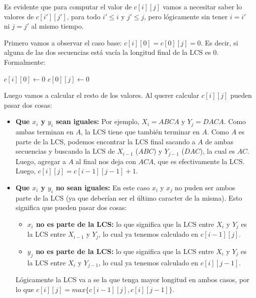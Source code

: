Es evidente que para computar el valor de $c[i][j]$ vamos a necesitar saber lo valores de $c[i'][j']$, para todo $i' \leq i$ y $j' \leq j$, pero l\'ogicamente sin tener $i = i'$ ni $j = j'$ al mismo tiempo.

Primero vamos a observar el caso base: $c[i][0] = c[0][j] = 0$. Es decir, si alguna de las dos secuencias est\'a vac\'ia la longitud final de la LCS es $0$. Formalmente:

\begin{algorithm}
\begin{algorithmic}[1]
  \State $c[i][0] \gets 0$
\EndFor
{}
  \State $c[0][j] \gets 0$
\EndFor
\end{algorithmic}
\end{algorithm}

Luego vamos a calcular el resto de los valores. Al querer calcular $c[i][j]$ pueden pasar dos cosas:

\begin{itemize}
\item \textbf{Que $x_i$ y $y_i$ sean iguales:} Por ejemplo, $X_i = ABCA$ y $Y_j = DACA$. Como ambas terminan en $A$, la LCS tiene que tambi\'en terminar en $A$. Como $A$ es parte de la LCS, podemos encontrar la LCS final sacando a $A$ de ambas secuencias y buscando la LCS de $X_{i-1}$ ($ABC$) y $Y_{j-1}$ ($DAC$), la cual es $AC$. Luego, agregar a $A$ al final nos deja con $ACA$, que es efectivamente la LCS. Luego, $c[i][j] = c[i-1][j-1] + 1$.
\item \textbf{Que $x_i$ y $y_i$ no sean iguales:} En este caso $x_i$ y $x_j$ no puden ser ambos parte de la LCS (ya que deber\'ian ser el \'ultimo caracter de la misma). Esto significa que pueden pasar dos cosas:
  \begin{itemize}
  \item \textbf{$x_i$ no es parte de la LCS:} lo que significa que la LCS entre $X_i$ y $Y_j$ es la LCS entre $X_{i-1}$ y $Y_j$, lo cual ya tenemos calculado en $c[i-1][j]$.
  \item \textbf{$y_j$ no es parte de la LCS:} lo que significa que la LCS entre $X_i$ y $Y_j$ es la LCS entre $X_i$ y $Y_{j-1}$, lo cual ya tenemos calculado en $c[i][j-1]$.
  \end{itemize}

L\'ogicamente la LCS va a se la que tenga mayor longitud en ambos casos, por lo que $c[i][j] = max\{c[i-1][j],c[i][j-1]\}$.
\end{itemize}

\newpage

